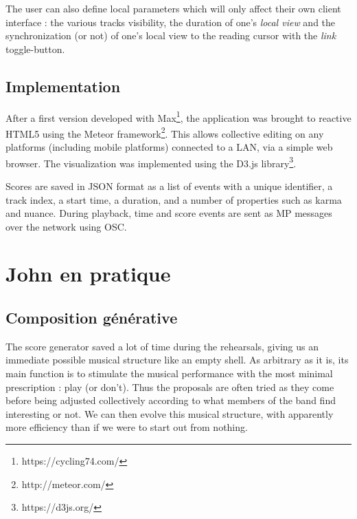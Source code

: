 The user can also define local parameters which will only affect their own client interface : the various tracks visibility, the duration of one's \textit{local view} and the synchronization (or not) of one's local view to the reading cursor with the \textit{link} toggle-button.

\subsection{Implementation}
After a first version developed with Max\footnote{https://cycling74.com/}, the application was brought to reactive HTML5 using the Meteor framework\footnote{ http://meteor.com/}. This allows collective editing on any platforms (including mobile platforms) connected to a LAN, via a simple web browser. The visualization was implemented using the D3.js library\footnote{https://d3js.org/}.

Scores are saved in JSON format as a list of events with a unique identifier, a track index, a start time, a duration, and a number of properties such as karma and nuance. During playback, time and score events are sent as MP messages \cite{goudard_mapping_2017} over the network using \gls{OSC}.

\section{John en pratique}
\subsection{Composition générative}

The score generator saved a lot of time during the rehearsals, giving us an immediate possible musical structure like an empty shell. As arbitrary as it is, its main function is to stimulate the musical performance with the most minimal prescription : play (or don't). Thus the proposals are often tried as they come before being adjusted collectively according to what members of the band find interesting or not. We can then evolve this musical structure, with apparently more efficiency than if we were to start out from nothing.
